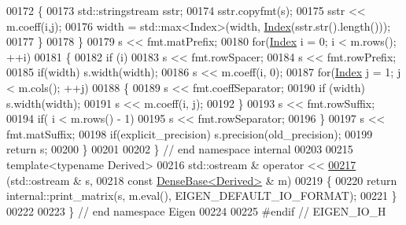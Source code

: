\begin{DoxyCode}
00172       \{
00173         std::stringstream sstr;
00174         sstr.copyfmt(s);
00175         sstr << m.coeff(i,j);
00176         width = std::max<Index>(width, \hyperlink{namespace_eigen_a62e77e0933482dafde8fe197d9a2cfde}{Index}(sstr.str().length()));
00177       \}
00178   \}
00179   s << fmt.matPrefix;
00180   \textcolor{keywordflow}{for}(\hyperlink{namespace_eigen_a62e77e0933482dafde8fe197d9a2cfde}{Index} i = 0; i < m.rows(); ++i)
00181   \{
00182     \textcolor{keywordflow}{if} (i)
00183       s << fmt.rowSpacer;
00184     s << fmt.rowPrefix;
00185     \textcolor{keywordflow}{if}(width) s.width(width);
00186     s << m.coeff(i, 0);
00187     \textcolor{keywordflow}{for}(\hyperlink{namespace_eigen_a62e77e0933482dafde8fe197d9a2cfde}{Index} j = 1; j < m.cols(); ++j)
00188     \{
00189       s << fmt.coeffSeparator;
00190       \textcolor{keywordflow}{if} (width) s.width(width);
00191       s << m.coeff(i, j);
00192     \}
00193     s << fmt.rowSuffix;
00194     \textcolor{keywordflow}{if}( i < m.rows() - 1)
00195       s << fmt.rowSeparator;
00196   \}
00197   s << fmt.matSuffix;
00198   \textcolor{keywordflow}{if}(explicit\_precision) s.precision(old\_precision);
00199   \textcolor{keywordflow}{return} s;
00200 \}
00201 
00202 \} \textcolor{comment}{// end namespace internal}
00203 
00215 \textcolor{keyword}{template}<\textcolor{keyword}{typename} Derived>
00216 std::ostream & \textcolor{keyword}{operator} <<
\hyperlink{group___core___module_a3806d3f42de165878dace160e6aba40a}{00217} (std::ostream & s,
00218  \textcolor{keyword}{const} \hyperlink{group___core___module_class_eigen_1_1_dense_base}{DenseBase<Derived>} & m)
00219 \{
00220   \textcolor{keywordflow}{return} internal::print\_matrix(s, m.eval(), EIGEN\_DEFAULT\_IO\_FORMAT);
00221 \}
00222 
00223 \} \textcolor{comment}{// end namespace Eigen}
00224 
00225 \textcolor{preprocessor}{#endif // EIGEN\_IO\_H}
\end{DoxyCode}
